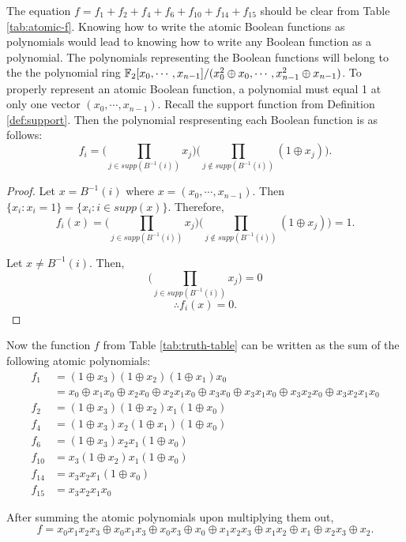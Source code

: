 \par The equation $f=f_1+f_2+f_4+f_6+f_{10}+f_{14}+f_{15}$ should be clear
from Table \ref{tab:atomic-f}. Knowing how to write the atomic Boolean
functions as polynomials would lead to knowing how to write any Boolean
function as a polynomial. The polynomials representing the Boolean functions
will belong to the the polynomial ring $\mathbb{F}_2[x_0,\cdots,x_{n-1}]/
(x_0^2\oplus x_0,\cdots,x_{n-1}^2\oplus x_{n-1})$. To properly represent
an atomic Boolean function, a polynomial must equal 1 at only one vector
$(x_0,\cdots,x_{n-1})$. Recall the support function from Definition
\ref{def:support}. Then the polynomial respresenting each Boolean function
is as follows:
\begin{equation}\label{eqn:atomic-ANF}
  f_i=\bigg(\prod_{j\in supp(B^{-1}(i))}x_j\bigg)
    \bigg(\prod_{j\not\in supp(B^{-1}(i))}(1\oplus x_j)\bigg).
\end{equation}
\begin{proof}
  Let $x=B^{-1}(i)$ where $x=(x_0,\cdots,x_{n-1})$. Then
  $\{x_i:x_i=1\}=\{x_i:i\in supp(x)\}$. Therefore,
  \[
  f_i(x)=\bigg(\prod_{j\in supp(B^{-1}(i))}x_j\bigg)
    \bigg(\prod_{j\not\in supp(B^{-1}(i))}(1\oplus x_j)\bigg)=1.
  \]

  Let $x\not=B^{-1}(i)$. Then,
  \[
  \bigg(\prod_{j\in supp(B^{-1}(i))}x_j\bigg)=0
  \]\[
  \therefore f_i(x)=0.
  \]
\end{proof}

\par Now the function $f$ from Table \ref{tab:truth-table} can be written as
the sum of the following atomic polynomials:
\begin{align*}
  f_1   &=(1\oplus x_3)(1\oplus x_2)(1\oplus x_1)x_0\\
        &=x_0 \oplus x_1x_0 \oplus x_2x_0 \oplus x_2x_1x_0 \oplus
          x_3x_0 \oplus x_3x_1x_0 \oplus x_3x_2x_0 \oplus x_3x_2x_1x_0\\
  f_2   &=(1\oplus x_3)(1\oplus x_2)x_1(1\oplus x_0)\\
  f_4   &=(1\oplus x_3)x_2(1\oplus x_1)(1\oplus x_0)\\
  f_6   &=(1\oplus x_3)x_2x_1(1\oplus x_0)\\
  f_{10}&=x_3(1\oplus x_2)x_1(1\oplus x_0)\\
  f_{14}&=x_3x_2x_1(1\oplus x_0)\\
  f_{15}&=x_3x_2x_1x_0
\end{align*}
\par After summing the atomic polynomials upon multiplying them out,
\[
	f=x_0x_1x_2x_3\oplus x_0x_1x_3 \oplus x_0x_3 \oplus x_0 \oplus x_1x_2x_3
    \oplus x_1x_2\oplus x_1\oplus x_2x_3 \oplus x_2.
\]

